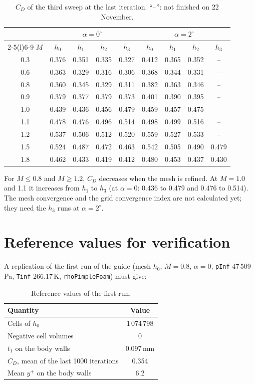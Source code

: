 \documentclass[11pt,a4paper]{article}
\newcommand{\unit}[2]{#1\,#2}
\newcommand{\yplus}{$y^+$}
\begin{document}
\begin{table}[htbp]
\centering
\caption{$C_D$ of the third sweep at the last iteration. ``--'': not finished on 22 November.}\label{tab:sweep3}
\begin{tabular}{@{}c cccc cccc@{}}
\toprule
 & \multicolumn{4}{c}{$\alpha = 0^\circ$} & \multicolumn{4}{c}{$\alpha = 2^\circ$} \\
\cmidrule(lr){2-5}\cmidrule(l){6-9}
$M$ & $h_0$ & $h_1$ & $h_2$ & $h_3$ & $h_0$ & $h_1$ & $h_2$ & $h_3$ \\
\midrule
0.3 & 0.376 & 0.351 & 0.335 & 0.327 & 0.412 & 0.365 & 0.352 & -- \\
0.6 & 0.363 & 0.329 & 0.316 & 0.306 & 0.368 & 0.344 & 0.331 & -- \\
0.8 & 0.360 & 0.345 & 0.329 & 0.311 & 0.382 & 0.363 & 0.346 & -- \\
0.9 & 0.379 & 0.377 & 0.379 & 0.373 & 0.401 & 0.390 & 0.395 & -- \\
1.0 & 0.439 & 0.436 & 0.456 & 0.479 & 0.459 & 0.457 & 0.475 & -- \\
1.1 & 0.478 & 0.476 & 0.496 & 0.514 & 0.498 & 0.499 & 0.516 & -- \\
1.2 & 0.537 & 0.506 & 0.512 & 0.520 & 0.559 & 0.527 & 0.533 & -- \\
1.5 & 0.524 & 0.487 & 0.472 & 0.463 & 0.542 & 0.505 & 0.490 & 0.479 \\
1.8 & 0.462 & 0.433 & 0.419 & 0.412 & 0.480 & 0.453 & 0.437 & 0.430 \\
\bottomrule
\end{tabular}
\end{table}

For $M \le 0.8$ and $M \ge 1.2$, $C_D$ decreases when the mesh is refined. At $M = 1.0$
and 1.1 it increases from $h_1$ to $h_3$ (at $\alpha = 0$: 0.436 to 0.479 and 0.476 to
0.514). The mesh convergence and the grid convergence index are not calculated yet; they
need the $h_3$ runs at $\alpha = 2^\circ$.

\section{Reference values for verification}\label{sec:verification}

A replication of the first run of the guide (mesh $h_0$, $M = 0.8$, $\alpha = 0$,
\texttt{pInf} 47\,509\,Pa, \texttt{Tinf} 266.17\,K, \texttt{rhoPimpleFoam}) must give:

\begin{table}[htbp]
\centering
\caption{Reference values of the first run.}\label{tab:verification}
\begin{tabular}{@{}lc@{}}
\toprule
Quantity & Value \\
\midrule
Cells of $h_0$ & 1\,074\,798 \\
Negative cell volumes & 0 \\
$t_1$ on the body walls & \unit{0.097}{mm} \\
$C_D$, mean of the last 1000 iterations & 0.354 \\
Mean \yplus{} on the body walls & 6.2 \\
\bottomrule
\end{tabular}
\end{table}
\end{document}
